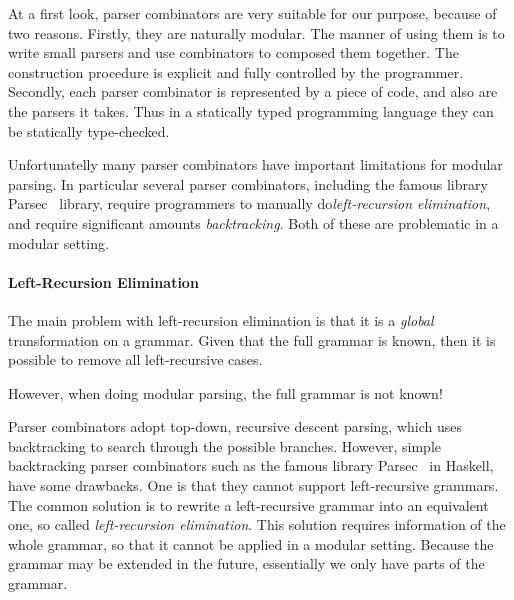 At a first look, parser combinators are very suitable for our purpose, because of two
reasons. Firstly, they are naturally modular. The manner of using them
is to write small parsers and use combinators to composed them
together. The construction procedure is explicit and fully controlled
by the programmer. Secondly, each parser combinator is represented by
a piece of code, and also are the parsers it takes. Thus in a
statically typed programming language they can be statically
type-checked.

Unfortunatelly many parser combinators have important limitations for
modular parsing. In particular several parser combinators,
including the famous library Parsec~\cite{} library, require
programmers to manually do\textit{left-recursion elimination}, and
require significant amounts \textit{backtracking}. Both of these are
problematic in a modular setting.

\paragraph{Left-Recursion Elimination} The main problem with
left-recursion elimination is that it is a \emph{global}
transformation on a grammar. Given that the full grammar is known,
then it is possible to remove all left-recursive cases.

However, when doing modular parsing, the full grammar is not known!


Parser combinators adopt top-down, recursive descent parsing, which
uses backtracking to search through the possible branches. However,
simple backtracking parser combinators such as the famous library
Parsec~\cite{} in Haskell, have some drawbacks. One is that they cannot
support left-recursive grammars. The common solution is to rewrite a
left-recursive grammar into an equivalent one, so called
\textit{left-recursion elimination}. This solution requires
information of the whole grammar, so that it cannot be applied in a
modular setting. Because the grammar may be extended in the future,
essentially we only have parts of the grammar.

